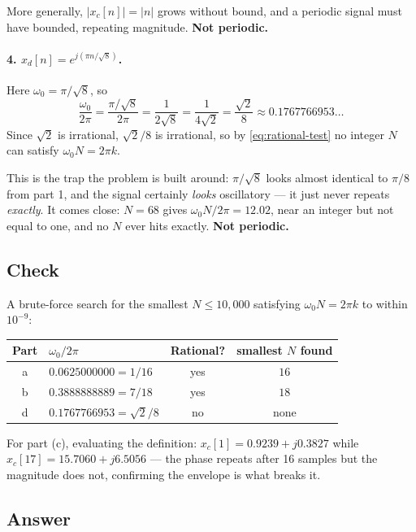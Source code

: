 More generally, $|x_c[n]| = |n|$ grows without bound, and a periodic signal must
have bounded, repeating magnitude. \textbf{Not periodic.}

\paragraph{4. $x_d[n] = e^{j(\pi n/\sqrt{8})}$.}
Here $\omega_0 = \pi/\sqrt{8}$, so
\begin{equation}
  \frac{\omega_0}{2\pi} = \frac{\pi/\sqrt{8}}{2\pi} = \frac{1}{2\sqrt{8}}
    = \frac{1}{4\sqrt{2}} = \frac{\sqrt{2}}{8} \approx 0.1767766953\ldots
\end{equation}
Since $\sqrt{2}$ is irrational, $\sqrt{2}/8$ is irrational, so by
\eqref{eq:rational-test} no integer $N$ can satisfy $\omega_0 N = 2\pi k$.

This is the trap the problem is built around: $\pi/\sqrt{8}$ looks almost
identical to $\pi/8$ from part 1, and the signal certainly \emph{looks}
oscillatory — it just never repeats \emph{exactly}. It comes close: $N = 68$
gives $\omega_0 N / 2\pi = 12.02$, near an integer but not equal to one, and no
$N$ ever hits exactly. \textbf{Not periodic.}

\subsection*{Check}

A brute-force search for the smallest $N \le 10{,}000$ satisfying
$\omega_0 N = 2\pi k$ to within $10^{-9}$:

\begin{center}
\begin{tabular}{clcc}
  \toprule
  Part & $\omega_0/2\pi$ & Rational? & smallest $N$ found \\
  \midrule
  a & $0.0625000000 = 1/16$ & yes & $16$ \\
  b & $0.3888888889 = 7/18$ & yes & $18$ \\
  d & $0.1767766953 = \sqrt{2}/8$ & no & none \\
  \bottomrule
\end{tabular}
\end{center}

For part (c), evaluating the definition: $x_c[1] = 0.9239 + j0.3827$ while
$x_c[17] = 15.7060 + j6.5056$ — the phase repeats after 16 samples but the
magnitude does not, confirming the envelope is what breaks it.

\subsection*{Answer}

